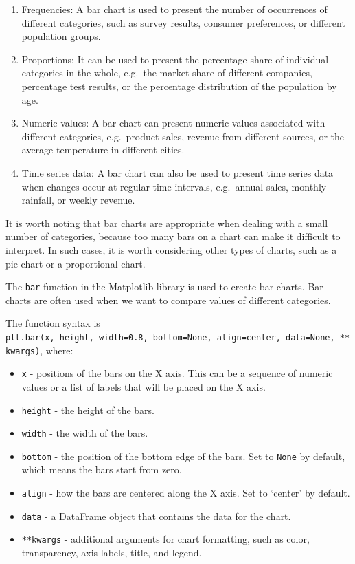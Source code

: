 \documentclass[
  english,
  letterpaper,
  DIV=11,
  numbers=noendperiod]{scrreprt}
\providecommand{\tightlist}{%
  \setlength{\itemsep}{0pt}\setlength{\parskip}{0pt}}
\begin{document}
\begin{enumerate}
\def\labelenumi{\arabic{enumi}.}
\tightlist
\item
  Frequencies: A bar chart is used to present the number of occurrences
  of different categories, such as survey results, consumer preferences,
  or different population groups.
\item
  Proportions: It can be used to present the percentage share of
  individual categories in the whole, e.g.~the market share of different
  companies, percentage test results, or the percentage distribution of
  the population by age.
\item
  Numeric values: A bar chart can present numeric values associated with
  different categories, e.g.~product sales, revenue from different
  sources, or the average temperature in different cities.
\item
  Time series data: A bar chart can also be used to present time series
  data when changes occur at regular time intervals, e.g.~annual sales,
  monthly rainfall, or weekly revenue.
\end{enumerate}

It is worth noting that bar charts are appropriate when dealing with a
small number of categories, because too many bars on a chart can make it
difficult to interpret. In such cases, it is worth considering other
types of charts, such as a pie chart or a proportional chart.

The \texttt{bar} function in the Matplotlib library is used to create
bar charts. Bar charts are often used when we want to compare values of
different categories.

The function syntax is
\texttt{plt.bar(x,\ height,\ width=0.8,\ bottom=None,\ align=\textquotesingle{}center\textquotesingle{},\ data=None,\ **kwargs)},
where:

\begin{itemize}
\tightlist
\item
  \texttt{x} - positions of the bars on the X axis. This can be a
  sequence of numeric values or a list of labels that will be placed on
  the X axis.
\item
  \texttt{height} - the height of the bars.
\item
  \texttt{width} - the width of the bars.
\item
  \texttt{bottom} - the position of the bottom edge of the bars. Set to
  \texttt{None} by default, which means the bars start from zero.
\item
  \texttt{align} - how the bars are centered along the X axis. Set to
  `center' by default.
\item
  \texttt{data} - a DataFrame object that contains the data for the
  chart.
\item
  \texttt{**kwargs} - additional arguments for chart formatting, such as
  color, transparency, axis labels, title, and legend.
\end{itemize}
\end{document}
